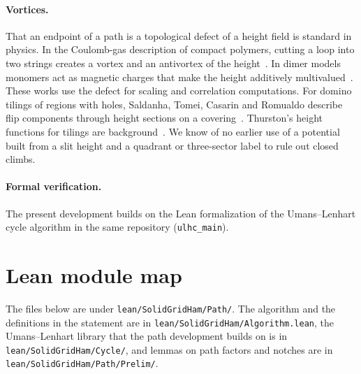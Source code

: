 \documentclass[11pt]{article}
\theoremstyle{plain}
\theoremstyle{definition}
\theoremstyle{remark}
\newcommand{\lean}[1]{\texttt{#1}}
\begin{document}
\paragraph{Vortices.}
That an endpoint of a path is a topological defect of a height field is standard in physics.
In the Coulomb-gas description of compact polymers, cutting a loop into two strings creates a vortex
and an antivortex of the height~\cite[\S7]{jacobsen1998}.
In dimer models monomers act as magnetic charges that make the height additively
multivalued~\cite{fisher1963,dubedat2011,basok2023}.
These works use the defect for scaling and correlation computations.
For domino tilings of regions with holes, Saldanha, Tomei, Casarin and Romualdo describe flip
components through height sections on a covering~\cite{saldanha1995}.
Thurston's height functions for tilings are background~\cite{thurston1990}.
We know of no earlier use of a potential built from a slit height and a quadrant or three-sector
label to rule out closed climbs.

\paragraph{Formal verification.}
The present development builds on the Lean formalization of the Umans--Lenhart cycle algorithm in
the same repository (\lean{ulhc\_main}).

\section{Lean module map}
\label{app:map}

The files below are under \lean{lean/SolidGridHam/Path/}.
The algorithm and the definitions in the statement are in \lean{lean/SolidGridHam/Algorithm.lean}, the Umans--Lenhart
library that the path development builds on is in \lean{lean/SolidGridHam/Cycle/}, and lemmas on
path factors and notches are in \lean{lean/SolidGridHam/Path/Prelim/}.
\end{document}
